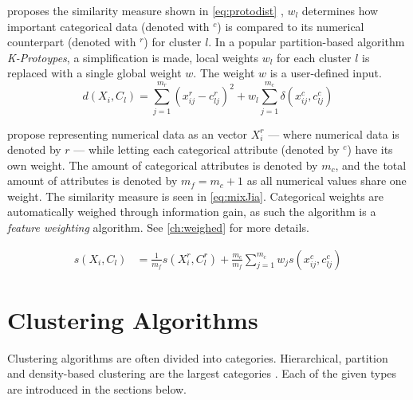 \documentclass[../report.tex]{subfiles}
\begin{document}
\citeauthor{Huang97clusteringlarge} proposes the similarity measure shown in \cref{eq:protodist} \cite{Huang97clusteringlarge}, $w_l$ determines how important categorical data (denoted with $^c$) is compared to its numerical counterpart (denoted with $^r$) for cluster $l$. In a popular partition-based algorithm \textit{K-Protoypes}, a simplification is made, local weights $w_l$ for each cluster $l$ is replaced with a single global weight $w$. The weight $w$ is a user-defined input.
\begin{equation}
\label{eq:protodist}
d(X_i, C_l) = \sum_{j=1}^{m_r}( x_{ij}^{r} - c_{lj}^{r} )^2 +
  w_l \sum_{j=1}^{m_c}\delta( x_{ij}^c, c_{lj}^c )
\end{equation}


\citeauthor{Cheung2013} \cite{Cheung2013} propose representing numerical data as an vector $X_{i}^{r}$ --- where numerical data is denoted by $r$ --- while letting each categorical attribute (denoted by $^c$) have its own weight. The amount of categorical attributes is denoted by $m_c$, and the total amount of attributes is denoted by $m_f = m_c + 1$ as all numerical values share one weight. The similarity measure is seen in \cref{eq:mixJia}. Categorical weights are automatically weighed through information gain, as such the algorithm is a \textit{feature weighting} algorithm. See \cref{ch:weighed} for more details.

\begin{align}
\label{eq:mixJia}
s(X_{i},C_{l}) &= \frac{1}{m_f}s(X_{i}^r,C_{l}^r) + \frac{m_c}{m_f}\sum_{j = 1}^{m_c}{{w_j}s(x_{ij}^c,c_{lj}^c)}
\end{align}
\begin{center}
\end{center}




\section{Clustering Algorithms}
Clustering algorithms are often divided into categories. Hierarchical, partition and density-based clustering are the largest categories \cite{Xu2015}. Each of the given types are introduced in the sections below.
\end{document}
